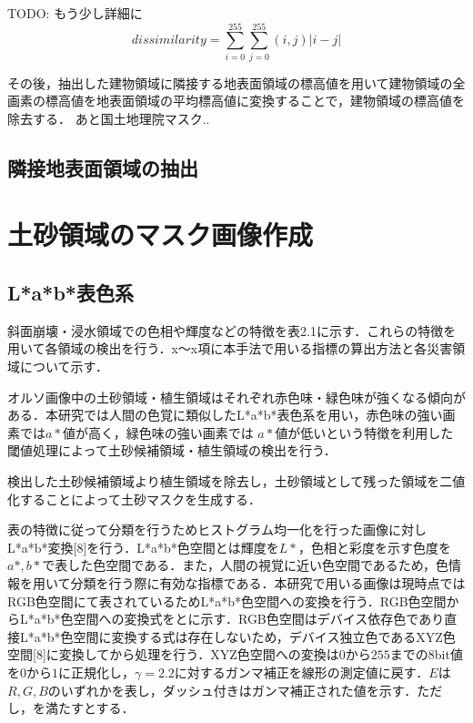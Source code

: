       TODO: もう少し詳細に
      \begin{equation}
        \label{異質度}
        dissimilarity = \sum_{i=0}^{255} \sum_{j=0}^{255} (i,j) |i-j|
      \end{equation}

      その後，抽出した建物領域に隣接する地表面領域の標高値を用いて建物領域の全画素の標高値を地表面領域の平均標高値に変換することで，建物領域の標高値を除去する．
      あと国土地理院マスク..

    \subsection{隣接地表面領域の抽出}

  
  \section{土砂領域のマスク画像作成}
    \label{土砂マスク}
    \subsection{L*a*b*表色系}
    斜面崩壊・浸水領域での色相や輝度などの特徴を表2.1に示す．これらの特徴を用いて各領域の検出を行う．x〜x項に本手法で用いる指標の算出方法と各災害領域について示す．

      オルソ画像中の土砂領域・植生領域はそれぞれ赤色味・緑色味が強くなる傾向がある．本研究では人間の色覚に類似したL*a*b*表色系を用い，赤色味の強い画素では$a*$値が高く，緑色味の強い画素では $a*$値が低いという特徴を利用した閾値処理によって土砂候補領域・植生領域の検出を行う．
      
      検出した土砂候補領域より植生領域を除去し，土砂領域として残った領域を二値化することによって土砂マスクを生成する．
  

      表\tref{}の特徴に従って分類を行うためヒストグラム均一化を行った画像に対しL*a*b*変換[8]を行う．L*a*b*色空間とは輝度を$L*$，色相と彩度を示す色度を$a*,b*$で表した色空間である．また，人間の視覚に近い色空間であるため，色情報を用いて分類を行う際に有効な指標である．本研究で用いる画像は現時点ではRGB色空間にて表されているためL*a*b*色空間への変換を行う．RGB色空間からL*a*b*色空間への変換式をとに示す．RGB色空間はデバイス依存色であり直接L*a*b*色空間に変換する式は存在しないため，デバイス独立色であるXYZ色空間[8]に変換してから処理を行う．XYZ色空間への変換は$0$から$255$までの8bit値を$0$から$1$に正規化し，$γ=2.2$に対するガンマ補正を線形の測定値に戻す．$E$は$R,G,B$のいずれかを表し，ダッシュ付きはガンマ補正された値を示す．ただし，を満たすとする．

